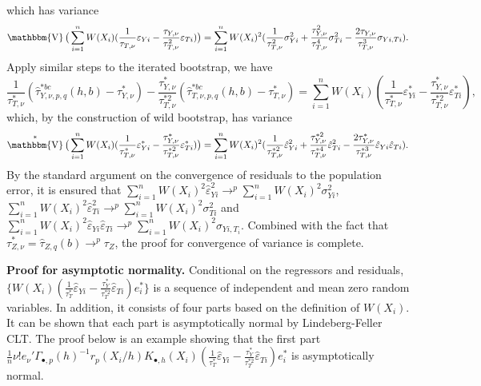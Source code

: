 \documentclass[12pt,]{article}
\DeclareMathOperator{\1}{\mathbbm{1}}
\DeclareMathOperator{\V}{\mathbbm{V}}
\begin{document}
which has variance
\begin{equation*}
	\V \big(\sum_{i = 1}^{n} W(X_i) (\frac{1}{\tau_{T, \nu}} \varepsilon_{Yi} - \frac{\tau_{Y, \nu}}{\tau_{T, \nu}^2} \varepsilon_{Ti})\big)
	= \sum_{i = 1}^{n} W(X_i)^2 (\frac{1}{\tau_{T, \nu}^2} \sigma_{Yi}^2 + \frac{\tau_{Y, \nu}^2}{\tau_{T, \nu}^4} \sigma_{Ti}^2 - 
	  \frac{2 \tau_{Y, \nu}}{\tau_{T, \nu}^3} \sigma_{Yi, Ti}).
\end{equation*}
Apply similar steps to the iterated bootstrap, we have
\begin{equation*}
	\frac{1}{\tau_{T, \nu}^*} (\hat\tau_{Y, \nu, p, q}^{*bc} (h, b) - \tau_{Y, \nu}^*) - 
	\frac{\tau_{Y, \nu}^*}{\tau_{T, \nu}^{*2}} (\hat\tau_{T, \nu, p, q}^{*bc} (h, b) - \tau_{T, \nu}^*)
	= \sum_{i = 1}^{n} W(X_i) (\frac{1}{\tau_{T, \nu}^*} \varepsilon_{Yi}^* - \frac{\tau_{Y, \nu}^*}{\tau_{T, \nu}^{*2}} \varepsilon_{Ti}^*), 
\end{equation*}
which, by the construction of wild bootstrap, has variance
\begin{equation*}
	\V^* \big(\sum_{i = 1}^{n} W(X_i) (\frac{1}{\tau_{T, \nu}^*} \varepsilon_{Yi}^* - \frac{\tau_{Y, \nu}^*}{\tau_{T, \nu}^{*2}} \varepsilon_{Ti}^*)\big)
	= \sum_{i = 1}^{n} W(X_i)^2 (\frac{1}{\tau_{T, \nu}^{*2}} \hat \varepsilon_{Yi}^2 + \frac{\tau_{Y, \nu}^{*2}}{\tau_{T, \nu}^{*4}} \hat\varepsilon_{Ti}^2 - \frac{2 \tau_{Y, \nu}^*}{\tau_{T, \nu}^{*3}} \hat \varepsilon_{Yi} \hat \varepsilon_{Ti}).
\end{equation*}
By the standard argument on the convergence of residuals to the population error, it is ensured that $\sum_{i = 1}^{n} W(X_i)^2 \hat \varepsilon_{Yi}^2 \to^p \sum_{i = 1}^{n} W(X_i)^2 \sigma_{Yi}^2$, $\sum_{i = 1}^{n} W(X_i)^2 \hat \varepsilon_{Ti}^2 \to^p \sum_{i = 1}^{n} W(X_i)^2 \sigma_{Ti}^2$ and $\sum_{i = 1}^{n} W(X_i)^2 \hat \varepsilon_{Yi} \hat \varepsilon_{Ti} \to^p \sum_{i = 1}^{n} W(X_i)^2 \sigma_{Yi, T_i}$. Combined with the fact that $\tau_{Z, \nu}^* = \hat \tau_{Z,q} (b) \to^p \tau_Z$, the proof for convergence of variance is complete.

\textbf{Proof for asymptotic normality.} Conditional on the regressors and residuals, $\{W(X_i) (\frac{1}{\tau_T^*} \hat \varepsilon_{Yi} - \frac{\tau_Y^*}{\tau_T^{*2}} \hat \varepsilon_{Ti}) e_i^*\}$ is a sequence of independent and mean zero random variables. In addition, it consists of four parts based on the definition of $W(X_i)$. It can be shown that each part is asymptotically normal by Lindeberg-Feller CLT. The proof below is an example showing that the first part $\tfrac{1}{n} \nu! e_\nu' \Gamma_{\bullet,p}(h)^{-1} r_p(X_i/h) K_{\bullet,h}(X_i) (\frac{1}{\tau_T^*} \hat \varepsilon_{Yi} - \frac{\tau_Y^*}{\tau_T^{*2}} \hat \varepsilon_{Ti}) e_i^*$ is asymptotically normal.
\end{document}
